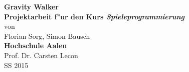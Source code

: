\begin{center}
\vspace{7 cm}
\textbf{\huge{Gravity Walker}}\\
\vspace{2 cm}
\textbf{\large{Projektarbeit f"ur den Kurs \textit{Spieleprogrammierung}}}\\
\vspace{1 cm}
von\\
\vspace{1 cm}
Florian Sorg, Simon Bausch\\
\vspace{2 cm}
\textbf{Hochschule Aalen}\\
\vspace{0.2 cm}
Prof. Dr. Carsten Lecon\\
\vspace{0.2 cm}
SS 2015
\end{center}
